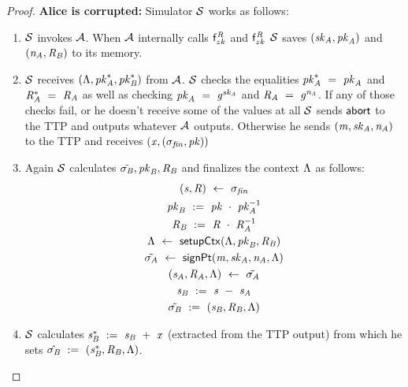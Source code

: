 \begin{proof}
    \textbf{Alice is corrupted: } Simulator $\mathcal{S}$ works as follows:
    \begin{enumerate}
        \item $\mathcal{S}$ invokes $\mathcal{A}$.
        When $\mathcal{A}$ internally calls $\mathsf{f}^{\mathit{R}}_{zk}$ and $\mathsf{f}^{\mathit{R}}_{zk}$ $\mathcal{S}$ saves $(\mathit{sk}_{\mathit{A}}, \mathit{pk}_{\mathit{A}})$ and $(\mathit{\mathit{n}_{\mathit{A}}}, \mathit{R}_{\mathit{B}})$ to its memory.
        \item $\mathcal{S}$ receives $(\Lambda, \mathit{pk}_{\mathit{A}}^*, \mathit{pk}_{\mathit{B}}^*)$ from $\mathcal{A}$.
        $\mathcal{S}$ checks the equalities $\mathit{pk}_{\mathit{A}}^* ~=~ \mathit{pk}_{\mathit{A}}$ and $\mathit{R}_{\mathit{A}}^* ~=~ \mathit{R}_{\mathit{A}}$ as well as checking $\mathit{pk}_{\mathit{A}} ~=~ \mathit{g}^{\mathit{sk}_{\mathit{A}}}$ and $\mathit{R}_{\mathit{A}} ~=~ \mathit{g}^{\mathit{\mathit{n}_{\mathit{A}}}}$.
        If any of those checks fail, or he doesn't receive some of the values at all $\mathcal{S}$ sends $\mathsf{abort}$ to the TTP and outputs whatever $\mathcal{A}$ outputs.
        Otherwise he sends $(\mathit{m}, \mathit{sk}_{\mathit{A}}, \mathit{\mathit{n}_{\mathit{A}}})$ to the TTP and receives $(\mathit{x}, (\sigma_{\mathit{fin}}, \mathit{pk}))$
        \item Again $\mathcal{S}$ calculates $\tilde{\sigma_{\mathit{B}}}, \mathit{pk}_{\mathit{B}}, \mathit{R}_{\mathit{B}}$ and finalizes the context $\Lambda$ as follows:
        \begin{gather*}
            (\mathit{s}, \mathit{R}) ~\leftarrow~ \sigma_{\mathit{fin}} \\
            \mathit{pk}_{\mathit{B}} ~:=~ \mathit{pk} ~\cdot~ \mathit{pk}_{\mathit{A}}^{-1} \\
            \mathit{R}_{\mathit{B}} ~:=~ \mathit{R} ~\cdot~ \mathit{R}_{\mathit{A}}^{-1} \\
            \Lambda ~\leftarrow~ \mathsf{setupCtx}( \Lambda, \mathit{pk}_{\mathit{B}}, \mathit{R}_{\mathit{B}} ) \\
            \tilde{\sigma_{\mathit{A}}} ~\leftarrow~ \mathsf{signPt}(\mathit{m}, \mathit{sk}_{\mathit{A}}, \mathit{\mathit{n}_{\mathit{A}}}, \Lambda) \\
            (\mathit{s}_{\mathit{A}}, \mathit{R}_{\mathit{A}}, \Lambda) ~\leftarrow~ \tilde{\sigma_{\mathit{A}}} \\
            \mathit{s}_{\mathit{B}} ~:=~ \mathit{s} ~-~ \mathit{s}_{\mathit{A}} \\
            \tilde{\sigma_{\mathit{B}}} ~:=~ (\mathit{s}_{\mathit{B}}, \mathit{R}_{\mathit{B}}, \Lambda)
        \end{gather*}
        \item $\mathcal{S}$ calculates $\mathit{s}_{\mathit{B}}^* ~:=~ \mathit{s}_{\mathit{B}} ~+~ \mathit{x}$ (extracted from the TTP output) from which he sets $\hat{\sigma_{\mathit{B}}} ~:=~ (\mathit{s}_{\mathit{B}}^*, \mathit{R}_{\mathit{B}}, \Lambda)$.

\end{enumerate}
\end{proof}
